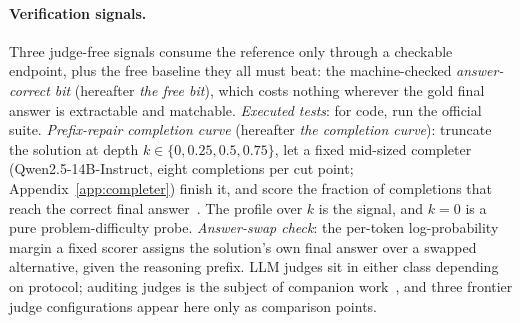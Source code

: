 \paragraph{Verification signals.}
Three judge-free signals consume the reference only through a checkable endpoint, plus the free baseline they all must beat: the machine-checked \emph{answer-correct bit} (hereafter \emph{the free bit}), which costs nothing wherever the gold final answer is extractable and matchable.
\emph{Executed tests}: for code, run the official suite.
\emph{Prefix-repair completion curve} (hereafter \emph{the completion curve}): truncate the solution at depth $k \in \{0, 0.25, 0.5, 0.75\}$, let a fixed mid-sized completer (Qwen2.5-14B-Instruct, eight completions per cut point; Appendix~\ref{app:completer}) finish it, and score the fraction of completions that reach the correct final answer~\cite{lightman2023verify,wang2022selfconsistency,wang2024mathshepherd,luo2024omegaprm}.
The profile over $k$ is the signal, and $k{=}0$ is a pure problem-difficulty probe.
\emph{Answer-swap check}: the per-token log-probability margin a fixed scorer assigns the solution's own final answer over a swapped alternative, given the reasoning prefix.
LLM judges sit in either class depending on protocol; auditing judges is the subject of companion work~\cite{companionA}, and three frontier judge configurations appear here only as comparison points.


